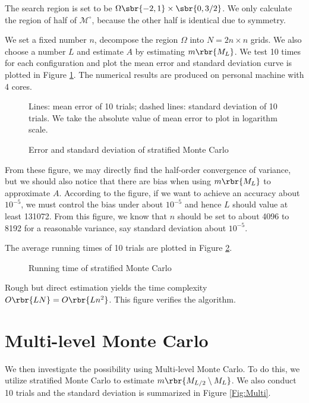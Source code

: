 \documentclass[english, nochinese]{pnote}
\begin{document}
The search region is set to be $ \Omega \sbr{ -2, 1 } \times \sbr{ 0, 3 / 2 } $. We only calculate the region of half of $\mathcal{M}^{\circ}$, because the other half is identical due to symmetry.

We set a fixed number $n$, decompose the region $\Omega$ into $ N = 2 n \times n $ grids. We also choose a number $L$ and estimate $A$ by estimating $ m \rbr{M_L} $. We test 10 times for each configuration and plot the mean error and standard deviation curve is plotted in Figure \ref{Fig:Err}. The numerical results are produced on personal machine with 4 cores.

\begin{figure}[htbp]
{
\centering

\caption{Error and standard deviation of stratified Monte Carlo}
\label{Fig:Err}
}
{
\footnotesize Lines: mean error of 10 trials; dashed lines: standard deviation of 10 trials. We take the absolute value of mean error to plot in logarithm scale.
}
\end{figure}

From these figure, we may directly find the half-order convergence of variance, but we should also notice that there are bias when using $ m \rbr{M_L} $ to approximate $A$. According to the figure, if we want to achieve an accuracy about $10^{-5}$, we must control the bias under about $10^{-5}$ and hence $L$ should value at least 131072. From this figure, we know that $n$ should be set to about 4096 to 8192 for a reasonable variance, say standard deviation about $10^{-5}$.

The average running times of 10 trials are plotted in Figure \ref{Fig:Time}.

\begin{figure}[htbp]
\centering

\caption{Running time of stratified Monte Carlo}
\label{Fig:Time}
\end{figure}

Rough but direct estimation yields the time complexity $ O \rbr{ L N } = O \rbr{ L n^2 } $. This figure verifies the algorithm.

\section{Multi-level Monte Carlo}

We then investigate the possibility using Multi-level Monte Carlo. To do this, we utilize stratified Monte Carlo to estimate $ m \rbr{ M_{ L / 2 } \setminus M_L } $. We also conduct 10 trials and the standard deviation is summarized in Figure \ref{Fig:Multi}.
\end{document}
